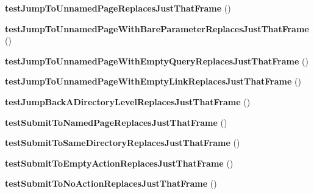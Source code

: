 \begin{DoxyCompactItemize}
\item 
\hypertarget{class_test_of_loading_frames_a75254123cf16adb11cb8c738768e8e1a}{
{\bfseries testJumpToUnnamedPageReplacesJustThatFrame} ()}
\label{class_test_of_loading_frames_a75254123cf16adb11cb8c738768e8e1a}

\item 
\hypertarget{class_test_of_loading_frames_a223c679d358ddb88f560b1a27940ae0a}{
{\bfseries testJumpToUnnamedPageWithBareParameterReplacesJustThatFrame} ()}
\label{class_test_of_loading_frames_a223c679d358ddb88f560b1a27940ae0a}

\item 
\hypertarget{class_test_of_loading_frames_a46859320aca8ab9bcbe32b2c8f18c404}{
{\bfseries testJumpToUnnamedPageWithEmptyQueryReplacesJustThatFrame} ()}
\label{class_test_of_loading_frames_a46859320aca8ab9bcbe32b2c8f18c404}

\item 
\hypertarget{class_test_of_loading_frames_a4b479124e2d5dd8da244bb8364528de6}{
{\bfseries testJumpToUnnamedPageWithEmptyLinkReplacesJustThatFrame} ()}
\label{class_test_of_loading_frames_a4b479124e2d5dd8da244bb8364528de6}

\item 
\hypertarget{class_test_of_loading_frames_a1fee2b61aa3ef8c3c25cd1995a9ac069}{
{\bfseries testJumpBackADirectoryLevelReplacesJustThatFrame} ()}
\label{class_test_of_loading_frames_a1fee2b61aa3ef8c3c25cd1995a9ac069}

\item 
\hypertarget{class_test_of_loading_frames_a6c80ba2cce1b5fad41d437e569272dd3}{
{\bfseries testSubmitToNamedPageReplacesJustThatFrame} ()}
\label{class_test_of_loading_frames_a6c80ba2cce1b5fad41d437e569272dd3}

\item 
\hypertarget{class_test_of_loading_frames_a446d84cd369ce48d404181b986712028}{
{\bfseries testSubmitToSameDirectoryReplacesJustThatFrame} ()}
\label{class_test_of_loading_frames_a446d84cd369ce48d404181b986712028}

\item 
\hypertarget{class_test_of_loading_frames_a96623bbb249fd06014d60906b433cda4}{
{\bfseries testSubmitToEmptyActionReplacesJustThatFrame} ()}
\label{class_test_of_loading_frames_a96623bbb249fd06014d60906b433cda4}

\item 
\hypertarget{class_test_of_loading_frames_a5530f693b28dc50cef830006bfa66870}{
{\bfseries testSubmitToNoActionReplacesJustThatFrame} ()}
\label{class_test_of_loading_frames_a5530f693b28dc50cef830006bfa66870}


\end{DoxyCompactItemize}
